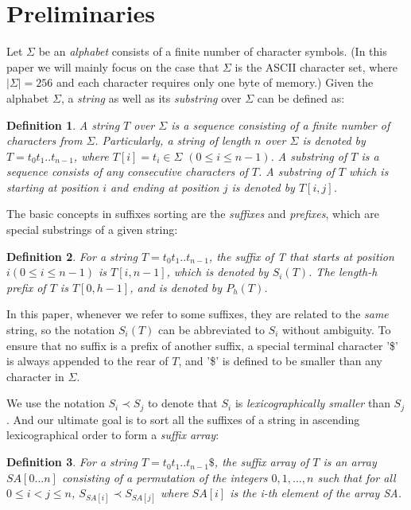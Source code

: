 \documentclass[legalpaper]{article}
\newtheorem{mydef}{Definition}
\begin{document}
\section{Preliminaries}
\label{sec:stucture}

Let $\Sigma$ be an \emph{alphabet} consists of a finite number of
character symbols. (In this paper we will mainly focus on the case
that $\Sigma$ is the ASCII character set, where $|\Sigma| = 256$ and
each character requires only one byte of memory.) Given the alphabet
$\Sigma$, a \emph{string} as well as its \emph{substring} over
$\Sigma$ can be defined as:

\begin{mydef} A string $T$ over $\Sigma$ is a sequence consisting of a
finite number of characters from $\Sigma$. Particularly, a string of
length $n$ over $\Sigma$ is denoted by $T = t_0t_1..t_{n-1}$, where
$T[i] = t_i \in \Sigma$ $(0 \leq i \leq n-1)$. A substring of $T$ is a
sequence consists of any consecutive characters of $T$. A substring of
$T$ which is starting at position $i$ and ending at position $j$ is
denoted by $T[i,j]$.
\end{mydef}

The basic concepts in suffixes sorting are the \emph{suffixes} and
\emph{prefixes}, which are special substrings of a given string:

\begin{mydef} For a string $T = t_0t_1..t_{n-1}$, the suffix of T that
starts at position $i(0 \leq i \leq n-1)$ is $T[i,n-1]$, which is
denoted by $S_i(T)$. The length-h prefix of $T$ is $T[0,h-1]$, and is
denoted by $P_h(T)$.
\end{mydef}

In this paper, whenever we refer to some suffixes, they are related to
the \emph{same} string, so the notation $S_i(T)$ can be abbreviated to
$S_i$ without ambiguity. To ensure that no suffix is a prefix of
another suffix, a special terminal character '\$' is always appended
to the rear of $T$, and '\$' is defined to be smaller than any
character in $\Sigma$.

We use the notation $S_i \prec S_j$ to denote that $S_i$ is
\emph{lexicographically smaller} than $S_j$. And our ultimate goal is
to sort all the suffixes of a string in ascending lexicographical
order to form a \emph{suffix array}:

\begin{mydef}
For a string $T = t_0t_1..t_{n-1}\$$, the suffix array of $T$ is an
array $SA[0 \dots n]$ consisting of a permutation of the integers $0,
1, \dots, n$ such that for all $0 \leq i < j \leq n$, $S_{SA[i]} \prec
S_{SA[j]}$ where $SA[i]$ is the i-th element of the array SA.
\end{mydef}
\end{document}
